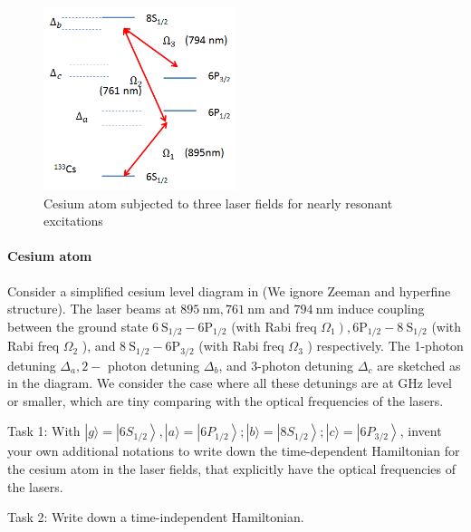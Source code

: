 \documentclass[hyperref, a4paper]{article}
\begin{document}
\paragraph{}

\begin{figure}
    \centering
    \includegraphics[width=0.5\textwidth]{fig2.png}
    \caption{Cesium atom subjected to three laser fields for nearly resonant excitations}
    \label{fig:sys-2}
\end{figure}

\paragraph{Cesium atom} Consider a simplified cesium level diagram in  (We ignore Zeeman and hyperfine structure). The laser beams at $895 \mathrm{~nm}, 761 \mathrm{~nm}$ and $794 \mathrm{~nm}$ induce coupling between the ground state $6 \mathrm{~S}_{1 / 2}-6 \mathrm{P}_{1 / 2}$ (with Rabi freq $\left.\Omega_{1}\right), 6 \mathrm{P}_{1 / 2}-8 \mathrm{~S}_{1 / 2}$ (with Rabi freq $\Omega_{2}$ ), and $8 \mathrm{~S}_{1 / 2}-6 \mathrm{P}_{3 / 2}$ (with Rabi freq $\Omega_{3}$ ) respectively. The 1-photon detuning $\Delta_{a}, 2-$ photon detuning $\Delta_{b}$, and 3-photon detuning $\Delta_{c}$ are sketched as in the diagram. We consider the case where all these detunings are at GHz level or smaller, which are tiny comparing with the optical frequencies of the lasers.

Task 1: With $|g\rangle=\left|6 S_{1 / 2}\right\rangle,|a\rangle=\left|6 P_{1 / 2}\right\rangle ;|b\rangle=\left|8 S_{1 / 2}\right\rangle ;|c\rangle=\left|6 P_{3 / 2}\right\rangle$, invent your own additional notations to write down the time-dependent Hamiltonian for the cesium atom in the laser fields, that explicitly have the optical frequencies of the lasers.

Task 2: Write down a time-independent Hamiltonian.
\end{document}
